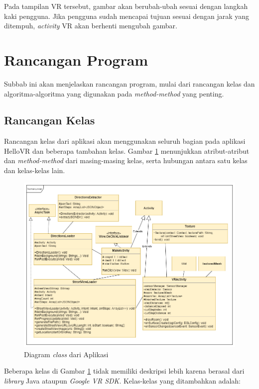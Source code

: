 Pada tampilan VR tersebut, gambar akan berubah-ubah sesuai dengan langkah kaki pengguna. Jika pengguna sudah mencapai tujuan sesuai dengan jarak yang ditempuh, \textit{activity} VR akan berhenti mengubah gambar.     

\section{Rancangan Program}
Subbab ini akan menjelaskan rancangan  program, mulai dari rancangan kelas dan algoritma-algoritma yang digunakan pada \textit{method-method} yang penting. 

\subsection{Rancangan Kelas}
Rancangan kelas dari aplikasi akan menggunakan seluruh bagian pada aplikasi HelloVR dan beberapa tambahan kelas. Gambar \ref{fig:class-diagram} menunjukkan atribut-atribut dan \textit{method-method} dari masing-masing kelas, serta hubungan antara satu kelas dan kelas-kelas lain. 

\begin{figure}[h]
	\centering
		\includegraphics[scale=0.6]{Gambar/class-diagram.png}
	\caption{Diagram \textit{class} dari Aplikasi}
	\label{fig:class-diagram}
\end{figure}

Beberapa kelas di Gambar \ref{fig:class-diagram} tidak memiliki deskripsi lebih karena berasal dari \textit{library} Java ataupun \textit{Google VR SDK}. Kelas-kelas yang ditambahkan adalah:

